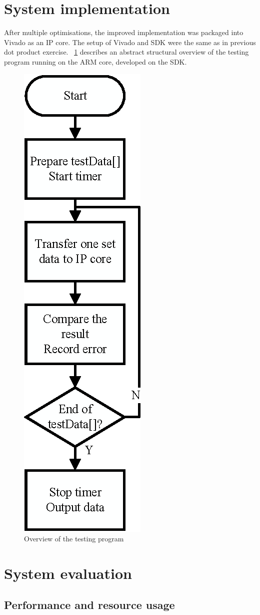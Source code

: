 \documentclass[journal]{IEEEtran}
\newcommand{\fref}[1]{\figurename~\ref{#1}}
\begin{document}
\section{System implementation}

After multiple optimisations, the improved implementation was packaged into Vivado as an IP core. The setup of Vivado and SDK were the same as in previous dot product exercise. \fref{fig:sdk} describes an abstract structural overview of the testing program running on the ARM core, developed on the SDK.

\begin{figure}[t]
	\centering
	\includegraphics[width=0.3\columnwidth]{sdk}
	\caption{Overview of the testing program}
	\label{fig:sdk}
\end{figure}

\section{System evaluation}

\subsection{Performance and resource usage}
\end{document}

